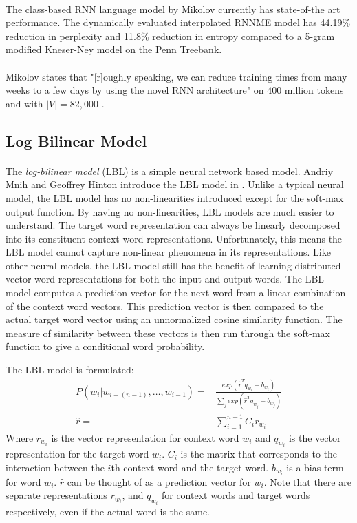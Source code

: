 \paragraph{}
The class-based RNN language model by Mikolov \cite{Mikolov2012} currently has state-of-the art performance. The dynamically evaluated interpolated RNNME model has 44.19\% reduction in perplexity and 11.8\% reduction in entropy compared to a 5-gram modified Kneser-Ney model on the Penn Treebank.
\paragraph{}
Mikolov states that "[r]oughly speaking, we can reduce training times from many weeks to a few days by using the novel RNN architecture" on $400$ million tokens and with $|V|=82,000$ \cite[pg. 93]{Mikolov2012}. 

\subsection{Log Bilinear Model} \label{sec:lbl}
\paragraph{}
The \emph{log-bilinear model} (LBL) is a simple neural network based model. Andriy Mnih and Geoffrey Hinton introduce the LBL model in \cite{MnihHinton2007}. Unlike a typical neural model, the LBL model has no non-linearities introduced except for the soft-max output function. By having no non-linearities, LBL models are much easier to understand. The target word representation can always be linearly decomposed into its constituent context word representations. Unfortunately, this means the LBL model cannot capture non-linear phenomena in its representations. Like other neural models, the LBL model still has the benefit of learning distributed vector word representations for both the input and output words.  The LBL model computes a prediction vector for the next word from a linear combination of the context word vectors. This prediction vector is then compared to the actual target word vector using an unnormalized cosine similarity function. The measure of similarity between these vectors is then run through the soft-max function to give a conditional word probability.

The LBL model is formulated:
\begin{align}
P(w_i | w_{i-(n-1)},\dots, w_{i-1})  =& \frac{ exp( \hat{r}^T q_{w_i} +b_{w_i}) } { \sum_j exp( \hat{r}^T q_{w_j} +b_{w_j})} \label{eq:LBL}
\\ 
\hat{r} =& \sum_{i=1}^{n-1} C_i r_{w_i} \nonumber
\end{align} 
Where $r_{w_i}$ is the vector representation for context word $w_i$ and $q_{w_i}$ is the vector representation for the target word $w_i$. $C_i$ is the matrix that corresponds to the interaction between the $i$th context word and the target word. $b_{w_i}$ is a bias term for word $w_i$. $\hat{r}$ can be thought of as a prediction vector for $w_i$. Note that there are separate representations $r_{w_i}$, and $q_{w_i}$ for context words and target words respectively, even if the actual word is the same.

